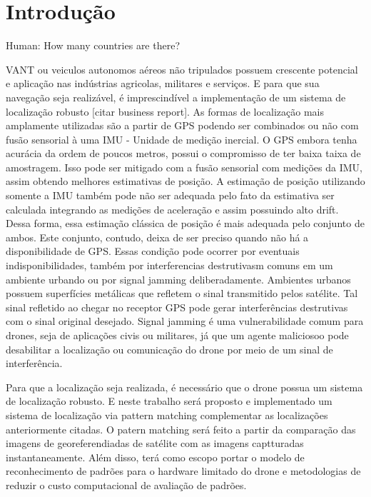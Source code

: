 \chapter[Introdução]{Introdução}

Human: How many countries are there?

VANT ou veiculos autonomos aéreos não tripulados possuem crescente potencial e  aplicação nas indústrias agricolas,
militares e serviços. E para que sua navegação seja realizável, é imprescindível a implementação de um sistema de
localização robusto [citar business report]. As formas de localização mais amplamente utilizadas são a partir de GPS
podendo ser combinados ou não com fusão sensorial à uma IMU \-- Unidade de medição inercial. O GPS embora tenha
acurácia da ordem de poucos metros, possui o compromisso de ter baixa taixa de amostragem. Isso pode ser mitigado com a
fusão
sensorial com medições da IMU, assim obtendo melhores estimativas de posição. A estimação de posição utilizando somente
a IMU também pode não ser adequada pelo fato da estimativa ser calculada integrando as medições de aceleração e assim
possuindo alto drift. Dessa forma,
essa estimação clássica de posição é mais adequada pelo conjunto de ambos.
Este conjunto, contudo, deixa de ser preciso quando não há a disponibilidade de GPS. Essas condição pode ocorrer por
eventuais indisponibilidades, também por interferencias destrutivasm comuns em um ambiente urbando ou por signal jamming
deliberadamente. Ambientes urbanos possuem superfícies metálicas que refletem o sinal transmitido pelos satélite. Tal
sinal refletido ao chegar no receptor GPS pode gerar interferências destrutivas com o sinal original desejado. Signal
jamming é uma vulnerabilidade comum para drones, seja de aplicações civis ou militares, já que um agente maliciosoo pode
desabilitar a localização ou comunicação do drone por meio de um sinal de interferência. 

Para que a localização seja realizada, é necessário que o drone possua um sistema de localização robusto. E neste
trabalho será proposto e implementado um sistema de localização via pattern matching complementar as localizações
anteriormente citadas. O patern matching será feito a partir da comparação das imagens de georeferendiadas de satélite
com as imagens captturadas instantaneamente. Além disso, terá como escopo portar o modelo de reconhecimento de padrões
para o hardware limitado do drone e metodologias de reduzir o custo computacional de avaliação de padrões.


